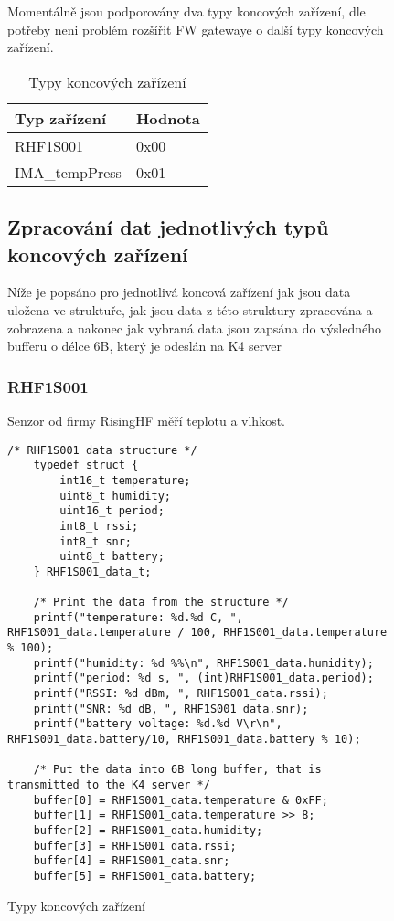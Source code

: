 \begin{figure}[!h]
Momentálně jsou podporovány dva typy koncových zařízení, dle potřeby neni problém rozšířit FW gatewaye o další typy koncových zařízení.

\begin{table}[!h]
    \centering
    \begin{tabular}{ |l|l| }
     \hline

     Typ zařízení       & Hodnota         \\ \hline \hline
     RHF1S001           & 0x00            \\ \hline
     IMA\_tempPress     & 0x01            \\ \hline
     
    \end{tabular}
    \caption{Typy koncových zařízení}
    \label{table:TypyKoncZarizeni}
\end{table}

\subsection{Zpracování dat jednotlivých typů koncových zařízení}
Níže je popsáno pro jednotlivá koncová zařízení jak jsou data uložena ve struktuře, jak jsou data z této struktury zpracována a zobrazena a nakonec jak vybraná data jsou zapsána do výsledného bufferu o délce 6B, který je odeslán na K4 server

\subsubsection{RHF1S001}
Senzor od firmy RisingHF měří teplotu a vlhkost.

\begin{lstlisting}[style=CStyle]
    /* RHF1S001 data structure */   
    typedef struct {
        int16_t temperature;
        uint8_t humidity;
        uint16_t period;
        int8_t rssi;
        int8_t snr;
        uint8_t battery;
    } RHF1S001_data_t;

    /* Print the data from the structure */
	printf("temperature: %d.%d C, ", RHF1S001_data.temperature / 100, RHF1S001_data.temperature % 100);
	printf("humidity: %d %%\n", RHF1S001_data.humidity);
	printf("period: %d s, ", (int)RHF1S001_data.period);
	printf("RSSI: %d dBm, ", RHF1S001_data.rssi);
	printf("SNR: %d dB, ", RHF1S001_data.snr);
	printf("battery voltage: %d.%d V\r\n", RHF1S001_data.battery/10, RHF1S001_data.battery % 10);

    /* Put the data into 6B long buffer, that is transmitted to the K4 server */
	buffer[0] = RHF1S001_data.temperature & 0xFF;
	buffer[1] = RHF1S001_data.temperature >> 8;
	buffer[2] = RHF1S001_data.humidity;
	buffer[3] = RHF1S001_data.rssi;
	buffer[4] = RHF1S001_data.snr;
	buffer[5] = RHF1S001_data.battery;
\end{lstlisting}



\end{figure}
